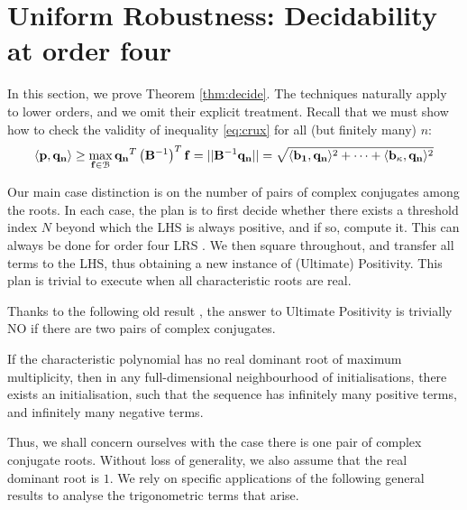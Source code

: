 \section{Uniform Robustness: Decidability at order four}
\label{section:decidability}
In this section, we prove Theorem \ref{thm:decide}. The techniques naturally apply to lower orders, and we omit their explicit treatment. Recall that we must show how to check the validity of inequality \ref{eq:crux} for all (but finitely many) $n$:
$$
\langle\mathbf{p}, \mathbf{q_n}\rangle \ge \max_{\mathbf{f} \in \mathcal{B}}\mathbf{q_n}^T\left(\mathbf{B}^{-1}\right)^T\mathbf{f} = ||\mathbf{B}^{-1}\mathbf{q_n}|| = \sqrt{\langle\mathbf{b_1}, \mathbf{q_n}\rangle^2 +\dots+\langle\mathbf{b_\kappa}, \mathbf{q_n}\rangle^2}
$$

Our main case distinction is on the number of pairs of complex conjugates among the roots. In each case, the plan is to first decide whether there exists a threshold index $N$ beyond which the LHS is always positive, and if so, compute it. This can always be done for order four LRS \cite{joeljames3}. We then square throughout, and transfer all terms to the LHS, thus obtaining a new instance of (Ultimate) Positivity. This plan is trivial to execute when all characteristic roots are real.

Thanks to the following old result \cite[Thm. 2]{positive-dominant}, the answer to Ultimate Positivity is trivially NO if there are two pairs of complex conjugates.

\begin{proposition}
\label{prop:folklore}
If the characteristic polynomial has no real dominant root of maximum multiplicity, then in any full-dimensional neighbourhood of initialisations, there exists an initialisation, such that the sequence has infinitely many positive terms, and infinitely many negative terms.
\end{proposition}

Thus, we shall concern ourselves with the case there is one pair of complex conjugate roots. Without loss of generality, we also assume that the real dominant root is $1$. We rely on specific applications of the following general results to analyse the trigonometric terms that arise.

